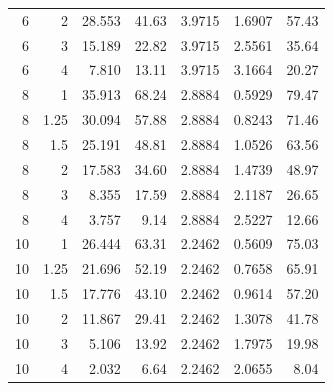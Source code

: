 \begin{table}[htbp]
\begin{tabular}{rrrrrrr}
6 & 2 & 28.553 & 41.63 & 3.9715 & 1.6907 & 57.43 \\
6 & 3 & 15.189 & 22.82 & 3.9715 & 2.5561 & 35.64 \\
6 & 4 & 7.810 & 13.11 & 3.9715 & 3.1664 & 20.27 \\
\midrule
8 & 1 & 35.913 & 68.24 & 2.8884 & 0.5929 & 79.47 \\
8 & 1.25 & 30.094 & 57.88 & 2.8884 & 0.8243 & 71.46 \\
8 & 1.5 & 25.191 & 48.81 & 2.8884 & 1.0526 & 63.56 \\
8 & 2 & 17.583 & 34.60 & 2.8884 & 1.4739 & 48.97 \\
8 & 3 & 8.355 & 17.59 & 2.8884 & 2.1187 & 26.65 \\
8 & 4 & 3.757 & 9.14 & 2.8884 & 2.5227 & 12.66 \\
\midrule
10 & 1 & 26.444 & 63.31 & 2.2462 & 0.5609 & 75.03 \\
10 & 1.25 & 21.696 & 52.19 & 2.2462 & 0.7658 & 65.91 \\
10 & 1.5 & 17.776 & 43.10 & 2.2462 & 0.9614 & 57.20 \\
10 & 2 & 11.867 & 29.41 & 2.2462 & 1.3078 & 41.78 \\
10 & 3 & 5.106 & 13.92 & 2.2462 & 1.7975 & 19.98 \\
10 & 4 & 2.032 & 6.64 & 2.2462 & 2.0655 & 8.04 \\
\bottomrule
\end{tabular}
\end{table}
